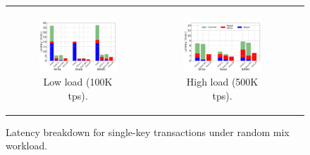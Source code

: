 \begin{figure}[hbt]
\centering
\begin{tabular}{ccc}
      \begin{subfigure}[t]{0.48\textwidth}
         \includegraphics[width=\textwidth]{figs/latency_allPUTGET.pdf}
        \caption[]{Low load (100K tps).}
        \label{fig:stack-brc}

      \end{subfigure} 
    
& 
      \begin{subfigure}[t]{0.48\textwidth}
      	\includegraphics[width=\textwidth]{figs/latencyHighThrough_PUTGETRMW.pdf}
	\caption{High load (500K tps).}
	\label{fig:hightx}
      \end{subfigure}  & 

\end{tabular}
       \caption{Latency breakdown  for single-key transactions under  random mix workload. }
\end{figure}

